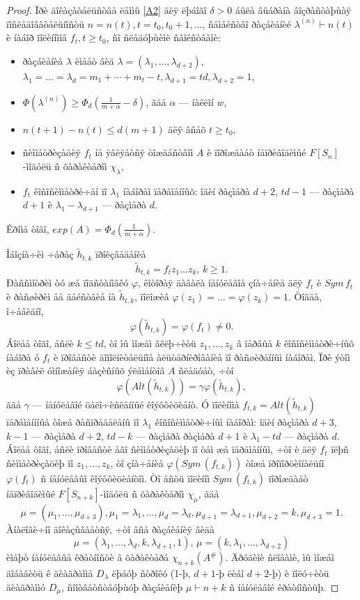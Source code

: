 \documentclass{article}
\numberwithin{equation}{section}
\theoremstyle{plain}
\theoremstyle{definition}
\newtheorem{proof}{Äîêàçàòåëüñòâî}
\begin{document}
\begin{fulltext}
\begin{proof}
Ïðè äîêàçàòåëüñòâå ëåììû \ref{A2} äëÿ ëþáîãî $\delta >0$ áûëà âûáðàíà âîçðàñòàþùàÿ ïîñëåäîâàòåëüíîñòü $n=n(t), t=t_0,t_0+1,\ldots$, ñåìåéñòâî ðàçáèåíèé 
$\lambda^{(n)}\vdash n(t)$ è íàáîð ïîëèíîìîâ $f_t, t\ge t_0$, ñî ñëåäóþùèìè ñâîéñòâàìè:
\begin{itemize}
\item
ðàçáèåíèå $\lambda$ èìååò âèä $\lambda=(\lambda_1,\ldots,\lambda_{d+2})$, 
$\lambda_1=\ldots= \lambda_d=m_1+\cdots+m_t-t, \lambda_{d+1}=td, \lambda_{d+2}=1$,
\item
$\Phi(\lambda^{(n)})\ge \Phi_d(\frac{1}{m+\alpha}-\delta)$, ãäå $\alpha$ --- íàêëîí $w$,
\item
$n(t+1)-n(t) \le d(m+1)$ äëÿ âñåõ $t\ge t_0$,
\item
ñèììåòðèçàöèÿ $f_t$ íå ÿâëÿåòñÿ òîæäåñòâîì $A$  è ïîðîæäàåò íåïðèâîäèìûé $F[S_n]$-ìîäóëü
ñ õàðàêòåðîì $\chi_\lambda$,
\item
$f_t$ êîñîñèììåòðè÷åí ïî $\lambda_1$ íàáîðàì ïåðåìåííûõ: îäèí ðàçìåðà $d+2$, $td-1$ --- ðàçìåðà
$d+1$ è $\lambda_1-\lambda_{d+1}$ --- ðàçìåðà $d$.
\end{itemize}
Êðîìå òîãî, $exp(A)=\Phi_d(\frac{1}{m+\alpha})$.

Îáîçíà÷èì ÷åðåç $\widetilde h_{t,k}$ ïðîèçâåäåíèå
$$
\widetilde h_{t,k}=f_tz_1\ldots z_k, \, k \ge 1.
$$
Ðàññìîòðèì òó æå ïîäñòàíîâêó $\varphi$, êîòîðàÿ äàâàëà íåíóëåâîå çíà÷åíèå äëÿ $f_t$
è $Sym\, f_t$ è ðàñøèðèì åå äåéñòâèå íà $\widetilde h_{t,k}$, ïîëîæèâ
$\varphi(z_1)=\ldots=\varphi(z_k)=1$. Òîãäà, î÷åâèäíî,
$$
\varphi(\widetilde h_{t,k})=\varphi(f_t)\ne 0.
$$
Áîëåå òîãî, åñëè $k\le td$, òî ìû ìîæåì âêëþ÷èòü $z_1,\ldots,z_k$ â ïåðâûå $k$ êîñîñèììåòðè÷íûõ
íàáîðà ó $f_t$ è ïðîâåñòè äîïîëíèòåëüíîå àëüòåðíèðîâàíèå ïî ðàñøèðåííûì íàáîðàì. Ïðè ýòîì èç 
ïðàâèë óìíîæåíèÿ áàçèñíûõ ýëåìåíòîâ $A$ ñëåäóåò, ÷òî
$$
\varphi(Alt(\widetilde h_{t,k}))=\gamma\varphi(\widetilde h_{t,k}),
$$
ãäå $\gamma$ --- íåíóëåâîé öåëî÷èñëåííûé êîýôôèöèåíò. Ó ïîëèíîìà $f_{t,k}=
Alt(\widetilde h_{t,k})$ ïåðåìåíííûå òîæå ðàñïðåäåëåíû ïî $\lambda_1$ êîñîñèììåòðè÷íûì
íàáîðàì: îäèí ðàçìåðà $d+3$, $k-1$ --- ðàçìåðà $d+2$, $td-k$ --- ðàçìåðà ðàçìåðà $d+1$
è  $\lambda_1-td$ --- ðàçìåðà $d$.
Áîëåå òîãî, åñëè ïðîâåñòè åãî ñèììåòðèçàöèþ ïî òåì æå ïåðåìåííûì, ÷òî è äëÿ $f_t$ ïëþñ
ñèììåòðèçàöèþ ïî $z_1,\ldots,z_k$, òî çíà÷åíèå $\varphi(Sym\,(f_{t,k}))$ òîæå ïðîïîðöèîíàëüíî
$\varphi(f_{t})$  ñ íåíóëåâûì êîýôôèöèåíòîì. Òî åñòü ïîëèíîì $Sym\,(f_{t,k})$ ïîðîæäàåò
íåïðèâîäèìûé $F[S_{n+k}]$-ìîäóëü ñ õàðàêòåðîì $\chi_\mu$, ãäå
$$
\mu = (\mu _1,\ldots,\mu_{d+3}), \mu_1=\lambda_1,\ldots, \mu_d=\lambda_d,
\mu_{d+1}=\lambda_{d+1}, \mu_{d+2}=k, \mu_{d+3}=1.
$$
Àíàëîãè÷íî äîêàçûâàåòñÿ, ÷òî âñå ðàçáèåíèÿ âèäà
$$
\mu=(\lambda_1,\ldots,\lambda_d,k,\lambda_{d+1},1),\,
\mu=(k,\lambda_1,\ldots,\lambda_{d+2})
$$
èìåþò íåíóëåâûå êðàòíîñòè â õàðàêòåðå $\chi_{n+k}(A^\#)$. Äðóãèìè ñëîâàìè, ìû ìîæåì äîáàâèòü 
ê äèàãðàììå $D_\lambda$ ëþáóþ ñòðîêó (1-þ, $d+1$-þ ëèáî $d+2$-þ) è ïîëó÷èòü äèàãðàììó 
$D_\mu$, ñîîòâåòñòâóþùóþ ðàçáèåíèþ $\mu\vdash n+k$ ñ íåíóëåâîé êðàòíîñòüþ.


\end{proof}
\end{fulltext}
\end{document}
